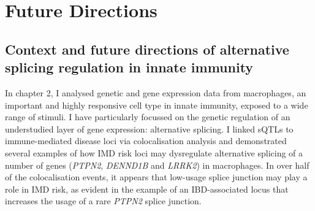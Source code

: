 \chapter{Future Directions}

\ifpdf
    \graphicspath{{Chapter5/Figs/Raster/}{Chapter5/Figs/PDF/}{Chapter5/Figs/}}
\else
    \graphicspath{{Chapter5/Figs/Vector/}{Chapter5/Figs/}}
\fi

\section{Context and future directions of alternative splicing regulation in innate immunity}
In chapter 2, I analysed genetic and gene expression data from macrophages, an important and highly responsive cell type in innate immunity, exposed to a wide range of stimuli. I have particularly focussed on the genetic regulation of an understudied layer of gene expression: alternative splicing. I linked sQTLs to immune-mediated disease loci via colocalisation analysis and demonstrated several examples of how IMD risk loci may dysregulate alternative splicing of a number of genes (\textit{PTPN2}, \textit{DENND1B} and \textit{LRRK2}) in macrophages. In over half of the colocalisation events, it appears that low-usage splice junction may play a role in IMD risk, as evident in the example of an IBD-associated locus that increases the usage of a rare \textit{PTPN2} splice junction. \\

